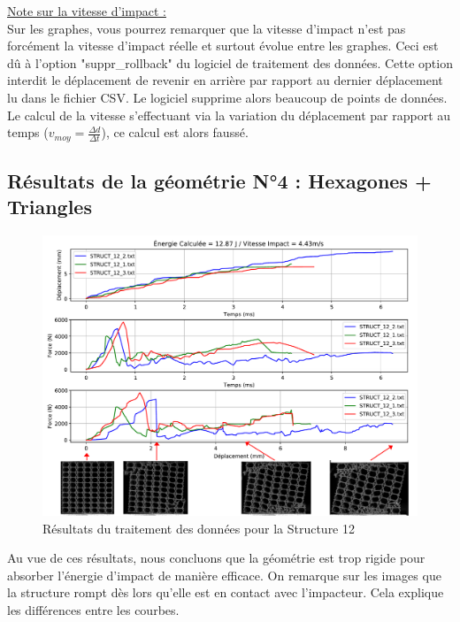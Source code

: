 \documentclass[a4paper]{article}
\begin{document}
	\underline{Note sur la vitesse d'impact :}\\
	
	Sur les graphes, vous pourrez remarquer que la vitesse d'impact n'est pas forcément la vitesse d'impact réelle et surtout évolue entre les graphes. Ceci est dû à l'option "suppr\_rollback" du logiciel de traitement des données. Cette option interdit le déplacement de revenir en arrière par rapport au dernier déplacement lu dans le fichier CSV. Le logiciel supprime alors beaucoup de points de données. Le calcul de la vitesse s'effectuant via la variation du déplacement par rapport au temps ($v_{moy} = \frac{\Delta d}{\Delta t}$), ce calcul est alors faussé.
	\newpage
	
	\subsection{Résultats de la géométrie N°4 : Hexagones + Triangles}
	\begin{figure}[H]
		\centering
		\includegraphics[width=16cm]{Images/7/7_2/STRUCT_12_AVECRUPTURE.pdf}
		\caption{Résultats du traitement des données pour la Structure 12}
	\end{figure}
	
	\hspace{0.5cm}Au vue de ces résultats, nous concluons que la géométrie est trop rigide pour absorber l'énergie d'impact de manière efficace. On remarque sur les images que la structure rompt dès lors qu'elle est en contact avec l'impacteur. Cela explique les différences entre les courbes.
	\newpage
	
\end{document}
